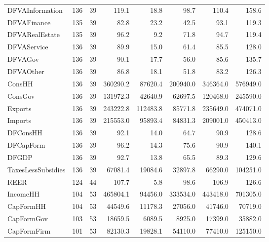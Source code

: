 {\begin{tabular}[t]{lrrrrrrr}
DFVAInformation & 136 & 39 & \num{119.1} & \num{18.8} & \num{98.7} & \num{110.4} & \num{158.6}\\
DFVAFinance & 135 & 39 & \num{82.8} & \num{23.2} & \num{42.5} & \num{93.1} & \num{119.3}\\
DFVARealEstate & 135 & 39 & \num{96.2} & \num{9.2} & \num{71.8} & \num{94.7} & \num{119.4}\\
DFVAService & 136 & 39 & \num{89.9} & \num{15.0} & \num{61.4} & \num{85.5} & \num{128.0}\\
DFVAGov & 136 & 39 & \num{90.1} & \num{17.7} & \num{56.0} & \num{85.6} & \num{135.7}\\
DFVAOther & 136 & 39 & \num{86.8} & \num{18.1} & \num{51.8} & \num{83.2} & \num{126.3}\\
ConsHH & 136 & 39 & \num{360290.2} & \num{87620.4} & \num{200940.0} & \num{346364.0} & \num{576949.0}\\
ConsGov & 136 & 39 & \num{131972.3} & \num{42640.9} & \num{62697.5} & \num{120468.0} & \num{245590.0}\\
Exports & 136 & 39 & \num{243222.8} & \num{112483.8} & \num{85771.8} & \num{235649.0} & \num{474071.0}\\
Imports & 136 & 39 & \num{215553.0} & \num{95893.4} & \num{84831.3} & \num{209001.0} & \num{450413.0}\\
DFConsHH & 136 & 39 & \num{92.1} & \num{14.0} & \num{64.7} & \num{90.9} & \num{128.6}\\
DFCapForm & 136 & 39 & \num{96.2} & \num{14.3} & \num{75.6} & \num{90.9} & \num{140.1}\\
DFGDP & 136 & 39 & \num{92.7} & \num{13.8} & \num{65.5} & \num{89.3} & \num{129.6}\\
TaxesLessSubsidies & 136 & 39 & \num{67081.4} & \num{19084.6} & \num{32897.8} & \num{66290.0} & \num{104251.0}\\
REER & 124 & 44 & \num{107.7} & \num{5.8} & \num{98.6} & \num{106.9} & \num{126.6}\\
IncomeHH & 104 & 53 & \num{465804.1} & \num{94456.0} & \num{333534.0} & \num{443418.0} & \num{701305.0}\\
CapFormHH & 104 & 53 & \num{44549.6} & \num{11178.3} & \num{27056.0} & \num{41746.0} & \num{70719.0}\\
CapFormGov & 103 & 53 & \num{18659.5} & \num{6089.5} & \num{8925.0} & \num{17399.0} & \num{35882.0}\\
CapFormFirm & 101 & 53 & \num{82130.3} & \num{19828.1} & \num{54110.0} & \num{77410.0} & \num{125150.0}\\

\end{tabular}}
